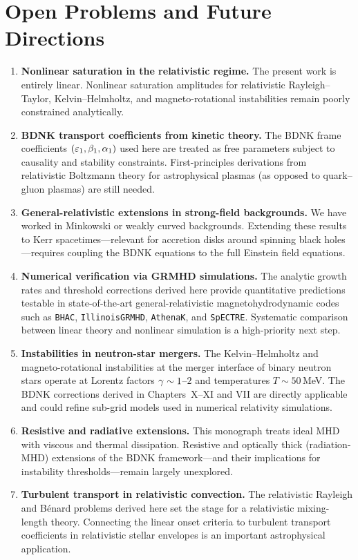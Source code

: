 \section{Open Problems and Future Directions}
\label{sec:open-problems}

\begin{enumerate}
\item \textbf{Nonlinear saturation in the relativistic regime.}
  The present work is entirely linear.  Nonlinear saturation amplitudes for
  relativistic Rayleigh--Taylor, Kelvin--Helmholtz, and magneto-rotational
  instabilities remain poorly constrained analytically.

\item \textbf{BDNK transport coefficients from kinetic theory.}
  The BDNK frame coefficients $(\varepsilon_1, \beta_1, \alpha_1)$ used here are
  treated as free parameters subject to causality and stability constraints.
  First-principles derivations from relativistic Boltzmann theory for
  astrophysical plasmas (as opposed to quark--gluon plasmas) are still needed.

\item \textbf{General-relativistic extensions in strong-field backgrounds.}
  We have worked in Minkowski or weakly curved backgrounds.  Extending these
  results to Kerr spacetimes---relevant for accretion disks around spinning
  black holes---requires coupling the BDNK equations to the full Einstein
  field equations.

\item \textbf{Numerical verification via GRMHD simulations.}
  The analytic growth rates and threshold corrections derived here provide
  quantitative predictions testable in state-of-the-art general-relativistic
  magnetohydrodynamic codes such as \texttt{BHAC}, \texttt{IllinoisGRMHD},
  \texttt{AthenaK}, and \texttt{SpECTRE}.  Systematic comparison between
  linear theory and nonlinear simulation is a high-priority next step.

\item \textbf{Instabilities in neutron-star mergers.}
  The Kelvin--Helmholtz and magneto-rotational instabilities at the
  merger interface of binary neutron stars operate at Lorentz factors
  $\gamma \sim 1$--$2$ and temperatures $T \sim 50$\,MeV.  The BDNK corrections
  derived in Chapters~X--XI and VII are directly applicable and could refine
  sub-grid models used in numerical relativity simulations.

\item \textbf{Resistive and radiative extensions.}
  This monograph treats ideal MHD with viscous and thermal dissipation.
  Resistive and optically thick (radiation-MHD) extensions of the BDNK
  framework---and their implications for instability thresholds---remain
  largely unexplored.

\item \textbf{Turbulent transport in relativistic convection.}
  The relativistic Rayleigh and B\'enard problems derived here set the stage
  for a relativistic mixing-length theory.  Connecting the linear onset
  criteria to turbulent transport coefficients in relativistic stellar
  envelopes is an important astrophysical application.
\end{enumerate}

